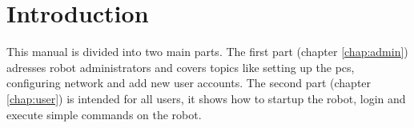 \chapter{Introduction}
\label{chap:introduction} 

This manual is divided into two main parts. The first part (chapter \ref{chap:admin}) adresses robot administrators and covers topics like setting up the pcs, configuring network and add new user accounts. The second part (chapter \ref{chap:user}) is intended for all users, it shows how to startup the robot, login and execute simple commands on the robot.


